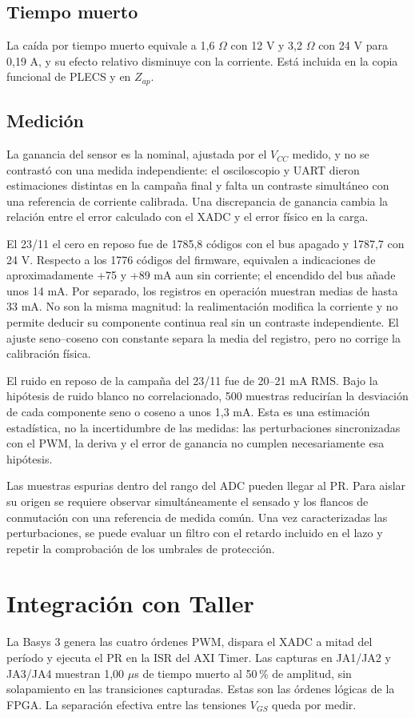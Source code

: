 \documentclass[conference]{IEEEtran}
\begin{document}
\subsection{Tiempo muerto}
La caída por tiempo muerto equivale a 1,6 $\Omega$ con 12 V y 3,2 $\Omega$ con 24 V para 0,19 A, y su efecto relativo disminuye con la corriente. Está incluida en la copia funcional de PLECS y en $Z_{ap}$.

\subsection{Medición}
La ganancia del sensor es la nominal, ajustada por el $V_{CC}$ medido, y no se contrastó con una medida independiente: el osciloscopio y UART dieron estimaciones distintas en la campaña final y falta un contraste simultáneo con una referencia de corriente calibrada. Una discrepancia de ganancia cambia la relación entre el error calculado con el XADC y el error físico en la carga.

El 23/11 el cero en reposo fue de 1785,8 códigos con el bus apagado y 1787,7 con 24 V. Respecto a los 1776 códigos del firmware, equivalen a indicaciones de aproximadamente +75 y +89 mA aun sin corriente; el encendido del bus añade unos 14 mA. Por separado, los registros en operación muestran medias de hasta 33 mA. No son la misma magnitud: la realimentación modifica la corriente y no permite deducir su componente continua real sin un contraste independiente. El ajuste seno--coseno con constante separa la media del registro, pero no corrige la calibración física.

El ruido en reposo de la campaña del 23/11 fue de 20--21 mA RMS. Bajo la hipótesis de ruido blanco no correlacionado, 500 muestras reducirían la desviación de cada componente seno o coseno a unos 1,3 mA. Esta es una estimación estadística, no la incertidumbre de las medidas: las perturbaciones sincronizadas con el PWM, la deriva y el error de ganancia no cumplen necesariamente esa hipótesis.

Las muestras espurias dentro del rango del ADC pueden llegar al PR. Para aislar su origen se requiere observar simultáneamente el sensado y los flancos de conmutación con una referencia de medida común. Una vez caracterizadas las perturbaciones, se puede evaluar un filtro con el retardo incluido en el lazo y repetir la comprobación de los umbrales de protección.


\section{Integración con Taller}
La Basys 3 genera las cuatro órdenes PWM, dispara el XADC a mitad del período y ejecuta el PR en la ISR del AXI Timer. Las capturas en JA1/JA2 y JA3/JA4 muestran 1,00 $\mu$s de tiempo muerto al 50\,\% de amplitud, sin solapamiento en las transiciones capturadas. Estas son las órdenes lógicas de la FPGA. La separación efectiva entre las tensiones $V_{GS}$ queda por medir.
\end{document}

